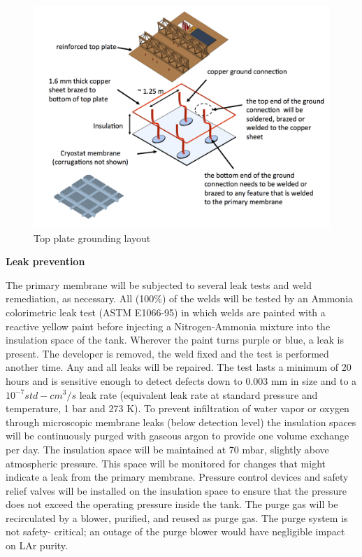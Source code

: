\begin{figure}
\begin{center}
\includegraphics[width=.95\textwidth]{figures/cryostat-top-plate-gnd} %
\caption[Top plate grounding layout]{\label{fig:top-plate-gnd}Top plate grounding layout}
\end{center}
\end{figure}

\textbf{Leak prevention}

The primary membrane will be subjected to several leak tests and weld remediation, as necessary. All 
(100\%) of the welds will be tested by an Ammonia colorimetric leak test (ASTM E1066-95) in which 
welds are painted with a reactive yellow paint before injecting a Nitrogen-Ammonia mixture into the 
insulation space of the tank. Wherever the paint turns purple or blue, a leak is present. The developer is 
removed, the weld fixed and the test is performed another time. Any and all leaks will be repaired. The 
test lasts a minimum of 20 hours and is sensitive enough to detect defects down to 0.003 mm in size 
and to a $10^{-7} std-cm^3/s$ leak rate (equivalent leak rate at standard pressure and temperature, 1 bar and 
273 K). To prevent infiltration of water vapor or oxygen through microscopic membrane leaks (below 
detection level) the insulation spaces will be continuously purged with gaseous argon to provide one 
volume exchange per day. The insulation space will be maintained at 70 mbar, slightly above 
atmospheric pressure. This space will be monitored for changes that might indicate a leak from the 
primary membrane. Pressure control devices and safety relief valves will be installed on the insulation 
space to ensure that the pressure does not exceed the operating pressure inside the tank. The purge gas 
will be recirculated by a blower, purified, and reused as purge gas. The purge system is not safety-
critical; an outage of the purge blower would have negligible impact on LAr purity.

